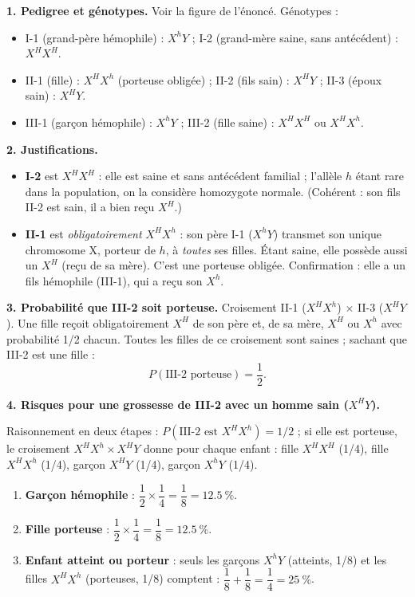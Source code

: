 \documentclass[11pt]{article}
\newcommand{\cle}[1]{{\popxbold\color{popdark}#1}}
\begin{document}
\begin{corrige}
\textbf{1. Pedigree et génotypes.} Voir la figure de l'énoncé. Génotypes :
\begin{itemize}
    \item I-1 (grand-père hémophile) : $X^h Y$ ; I-2 (grand-mère saine, sans antécédent) : $X^H X^H$.
    \item II-1 (fille) : $X^H X^h$ (porteuse obligée) ; II-2 (fils sain) : $X^H Y$ ; II-3 (époux sain) : $X^H Y$.
    \item III-1 (garçon hémophile) : $X^h Y$ ; III-2 (fille saine) : $X^H X^H$ ou $X^H X^h$.
\end{itemize}

\textbf{2. Justifications.}
\begin{itemize}
    \item \textbf{I-2} est $X^H X^H$ : elle est saine et sans antécédent familial ; l'allèle $h$ étant rare dans la population, on la considère homozygote normale. (Cohérent : son fils II-2 est sain, il a bien reçu $X^H$.)
    \item \textbf{II-1} est \emph{obligatoirement} $X^H X^h$ : son père I-1 ($X^h Y$) transmet son unique chromosome X, porteur de $h$, à \emph{toutes} ses filles. Étant saine, elle possède aussi un $X^H$ (reçu de sa mère). C'est une \cle{porteuse obligée}. Confirmation : elle a un fils hémophile (III-1), qui a reçu son $X^h$.
\end{itemize}

\textbf{3. Probabilité que III-2 soit porteuse.} Croisement II-1 ($X^H X^h$) $\times$ II-3 ($X^H Y$). Une fille reçoit obligatoirement $X^H$ de son père et, de sa mère, $X^H$ ou $X^h$ avec probabilité 1/2 chacun. Toutes les filles de ce croisement sont saines ; sachant que III-2 est une fille :
\[ P(\text{III-2 porteuse}) = \frac{1}{2}. \]

\textbf{4. Risques pour une grossesse de III-2 avec un homme sain ($X^H Y$).}

Raisonnement en deux étapes : $P(\text{III-2 est } X^H X^h) = 1/2$ ; si elle est porteuse, le croisement $X^H X^h \times X^H Y$ donne pour chaque enfant : fille $X^H X^H$ (1/4), fille $X^H X^h$ (1/4), garçon $X^H Y$ (1/4), garçon $X^h Y$ (1/4).
\begin{enumerate}
    \item \textbf{Garçon hémophile} : $\dfrac{1}{2} \times \dfrac{1}{4} = \dfrac{1}{8} = \SI{12,5}{\percent}$.
    \item \textbf{Fille porteuse} : $\dfrac{1}{2} \times \dfrac{1}{4} = \dfrac{1}{8} = \SI{12,5}{\percent}$.
    \item \textbf{Enfant atteint ou porteur} : seuls les garçons $X^h Y$ (atteints, 1/8) et les filles $X^H X^h$ (porteuses, 1/8) comptent : $\dfrac{1}{8} + \dfrac{1}{8} = \dfrac{1}{4} = \SI{25}{\percent}$.
\end{enumerate}


\end{corrige}
\end{document}
